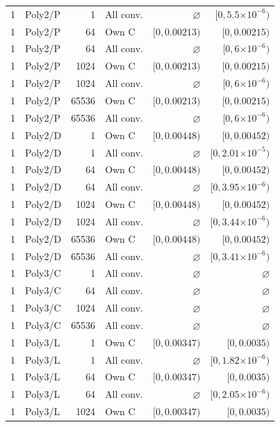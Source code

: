 \begin{longtable}{llrlrr}
1 & Poly2/P & 1 & All conv. & $\varnothing$ & $[0, 5.5\mathord{\times}10^{-6})$ \\
1 & Poly2/P & 64 & Own C & $[0, 0.00213)$ & $[0, 0.00215)$ \\
1 & Poly2/P & 64 & All conv. & $\varnothing$ & $[0, 6\mathord{\times}10^{-6})$ \\
1 & Poly2/P & 1024 & Own C & $[0, 0.00213)$ & $[0, 0.00215)$ \\
1 & Poly2/P & 1024 & All conv. & $\varnothing$ & $[0, 6\mathord{\times}10^{-6})$ \\
1 & Poly2/P & 65536 & Own C & $[0, 0.00213)$ & $[0, 0.00215)$ \\
1 & Poly2/P & 65536 & All conv. & $\varnothing$ & $[0, 6\mathord{\times}10^{-6})$ \\
1 & Poly2/D & 1 & Own C & $[0, 0.00448)$ & $[0, 0.00452)$ \\
1 & Poly2/D & 1 & All conv. & $\varnothing$ & $[0, 2.01\mathord{\times}10^{-5})$ \\
1 & Poly2/D & 64 & Own C & $[0, 0.00448)$ & $[0, 0.00452)$ \\
1 & Poly2/D & 64 & All conv. & $\varnothing$ & $[0, 3.95\mathord{\times}10^{-6})$ \\
1 & Poly2/D & 1024 & Own C & $[0, 0.00448)$ & $[0, 0.00452)$ \\
1 & Poly2/D & 1024 & All conv. & $\varnothing$ & $[0, 3.44\mathord{\times}10^{-6})$ \\
1 & Poly2/D & 65536 & Own C & $[0, 0.00448)$ & $[0, 0.00452)$ \\
1 & Poly2/D & 65536 & All conv. & $\varnothing$ & $[0, 3.41\mathord{\times}10^{-6})$ \\
1 & Poly3/C & 1 & All conv. & $\varnothing$ & $\varnothing$ \\
1 & Poly3/C & 64 & All conv. & $\varnothing$ & $\varnothing$ \\
1 & Poly3/C & 1024 & All conv. & $\varnothing$ & $\varnothing$ \\
1 & Poly3/C & 65536 & All conv. & $\varnothing$ & $\varnothing$ \\
1 & Poly3/L & 1 & Own C & $[0, 0.00347)$ & $[0, 0.0035)$ \\
1 & Poly3/L & 1 & All conv. & $\varnothing$ & $[0, 1.82\mathord{\times}10^{-6})$ \\
1 & Poly3/L & 64 & Own C & $[0, 0.00347)$ & $[0, 0.0035)$ \\
1 & Poly3/L & 64 & All conv. & $\varnothing$ & $[0, 2.05\mathord{\times}10^{-6})$ \\
1 & Poly3/L & 1024 & Own C & $[0, 0.00347)$ & $[0, 0.0035)$ \\

\end{longtable}
